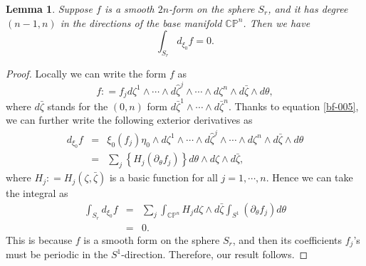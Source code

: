 \documentclass[a4paper,11pt]{amsart}
\numberwithin{equation}{section}
\newtheorem{lemma}[theorem]{Lemma}
\def\d{\partial}
\def\bC{{\mathbb C}}
\def\bP{{\mathbb P}}
\def\z{{\zeta}}
\begin{document}
\begin{lemma}
\label{lem-df-001}
Suppose $f$ is a smooth $2n$-form on the sphere $S_r$, 
and it has degree $(n-1, n)$ in the directions of the base manifold $\bC\bP^n$. 
Then we have 
\begin{equation}
\label{df-015}
\int_{S_r} d_{\xi_0} f =0. 
\end{equation}
\end{lemma}
\begin{proof}
Locally we can write the form $f$ as 
$$ f: = f_j d\z^1 \wedge \cdots \wedge d \hat{\z}^j \wedge \cdots \wedge d\z^n \wedge d\bar\z \wedge d\theta,$$
where $d\bar \z$ stands for the $(0,n)$ form $d\bar\z^1 \wedge \cdots \wedge d\bar \z^n$. 
Thanks to equation \eqref{bf-005}, 
we can further write the following exterior derivatives as 
\begin{eqnarray}
\label{df-016}
d_{\xi_0} f &=& \xi_0 (f_j) \eta_0 \wedge d\z^1 \wedge \cdots \wedge d \hat{\z}^j \wedge \cdots \wedge d\z^n \wedge d\bar\z \wedge d\theta
\nonumber\\
&=&  \sum_j \left\{ H_j ( \d_{\theta} f_j ) \right\}  d\theta\wedge d\z \wedge d\bar\z,
\end{eqnarray}
where $H_j: = H_j (\z, \bar\z)$ is a basic function for all $j=1,\cdots, n$.
Hence we can take the integral as 
\begin{eqnarray}
\label{df-017}
\int_{S_r} d_{\xi_0} f &=&   \sum_j \int_{\bC\bP^n} H_j d\z \wedge d\bar\z \int_{S^1} (\d_{\theta} f_j) d\theta
\nonumber\\
&=& 0. 
\end{eqnarray}
This is because $f$ is a smooth form on the sphere $S_r$, 
and then its coefficients $f_j$'s must be periodic in the $S^1$-direction. 
Therefore, our result follows. 





\end{proof}

\bigskip













\bigskip
\bigskip




\bigskip
\end{document}
